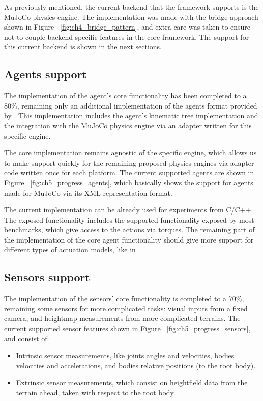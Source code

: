 As previously mentioned, the current backend that the framework supports is the
MuJoCo physics engine. The implementation was made with the bridge approach shown
in Figure ~\ref{fig:ch4_bridge_pattern}, and extra care was taken to ensure not
to couple backend specific features in the core framework. The support for this 
current backend is shown in the next sections.

\subsection*{Agents support}

The implementation of the agent's core functionality has been completed to a 80\%,
remaining only an additional implementation of the agents format provided by \cite{TerrainRLSim}.
This implementation includes the agent's kinematic tree implementation and the integration 
with the MuJoCo physics engine via an adapter written for this specific engine.

The core implementation remains agnostic of the specific engine, which allows us
to make support quickly for the remaining proposed physics engines via adapter code
written once for each platform. The current supported agents are shown in Figure ~\ref{fig:ch5_progress_agents},
which basically shows the support for agents made for MuJoCo via its XML representation format.

The current implementation can be already used for experiments from C/C++. The exposed
functionality includes the supported functionality exposed by most benchmarks, which
give access to the actions via torques. The remaining part of the implementation of the core
agent functionality should give more support for different types of actuation models, like in \cite{ActuationChoice}.

\figProgressAgents

\subsection*{Sensors support}

The implementation of the sensors' core functionality is completed to a 70\%,
remaining some sensors for more complicated tasks: visual inputs from a fixed camera,
and heightmap measurements from more complicated terrains. The current supported sensor
features shown in Figure ~\ref{fig:ch5_progress_sensors}, and consist of:

\begin{itemize}
    \item Intrinsic sensor measurements, like joints angles and velocities, bodies velocities
          and accelerations, and bodies relative positions (to the root body).
    \item Extrinsic sensor measurements, which consist on heightfield data from the terrain ahead,
          taken with respect to the root body.
\end{itemize}

